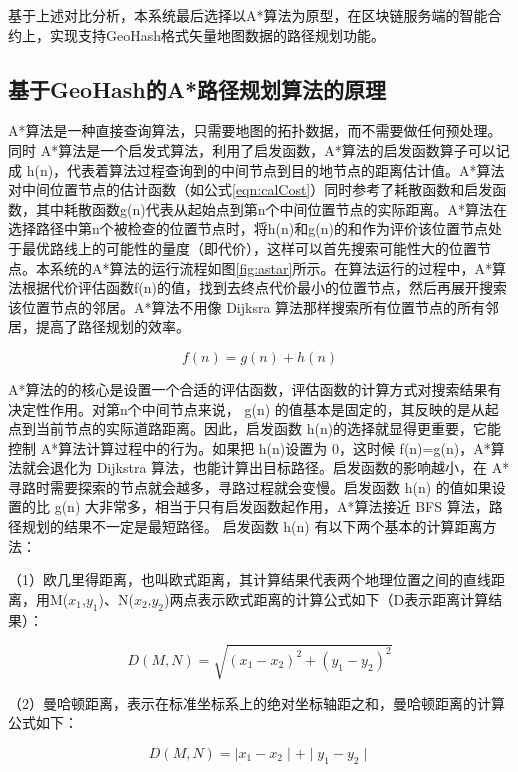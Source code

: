 基于上述对比分析，本系统最后选择以A*算法为原型，在区块链服务端的智能合约上，实现支持GeoHash格式矢量地图数据的路径规划功能。

\subsection{基于GeoHash的A*路径规划算法的原理}
A*算法是一种直接查询算法，只需要地图的拓扑数据，而不需要做任何预处理。同时 A*算法是一个启发式算法，利用了启发函数，A*算法的启发函数算子可以记成 h(n)，代表着算法过程查询到的中间节点到目的地节点的距离估计值。A*算法对中间位置节点的估计函数（如公式\ref{eqn:calCost}）同时参考了耗散函数和启发函数，其中耗散函数g(n)代表从起始点到第n个中间位置节点的实际距离。A*算法在选择路径中第n个被检查的位置节点时，将h(n)和g(n)的和作为评价该位置节点处于最优路线上的可能性的量度（即代价），这样可以首先搜索可能性大的位置节点。本系统的A*算法的运行流程如图\ref{fig:astar}所示。在算法运行的过程中，A*算法根据代价评估函数f(n)的值，找到去终点代价最小的位置节点，然后再展开搜索该位置节点的邻居。A*算法不用像 Dijksra 算法那样搜索所有位置节点的所有邻居，提高了路径规划的效率。

\begin{equation}
  \label{eqn:calCost}
  f(n)=g(n)+h(n)
\end{equation}

A*算法的的核心是设置一个合适的评估函数，评估函数的计算方式对搜索结果有决定性作用。对第n个中间节点来说， g(n) 的值基本是固定的，其反映的是从起点到当前节点的实际道路距离。因此，启发函数 h(n)的选择就显得更重要，它能控制 A*算法计算过程中的行为。如果把 h(n)设置为 0，这时候 f(n)=g(n)，A*算法就会退化为 Dijkstra 算法，也能计算出目标路径。启发函数的影响越小，在 A*寻路时需要探索的节点就会越多，寻路过程就会变慢。启发函数 h(n) 的值如果设置的比 g(n) 大非常多，相当于只有启发函数起作用，A*算法接近 BFS 算法，路径规划的结果不一定是最短路径。
启发函数 h(n) 有以下两个基本的计算距离方法：

（1）欧几里得距离，也叫欧式距离，其计算结果代表两个地理位置之间的直线距离，用M($x_1$,$y_1$)、N($x_2$,$y_2$)两点表示欧式距离的计算公式如下（D表示距离计算结果）：

\begin{equation}
  \label{eqn:Euclid}
  D(M, N)=\sqrt{(x_1-x_2)^{2}+(y_1-y_2)^{2}}
\end{equation}

（2）曼哈顿距离，表示在标准坐标系上的绝对坐标轴距之和，曼哈顿距离的计算公式如下：

\begin{equation}
  \label{eqn:manhattan}
  D(M, N)=\mid x_1-x_2 \mid+\mid y_1-y_2 \mid
\end{equation}

